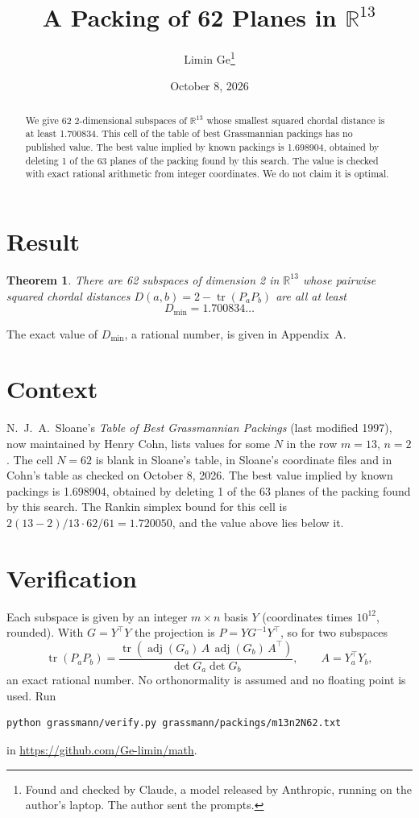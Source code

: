 \documentclass[11pt,a4paper]{article}
\title{A Packing of 62 Planes in $\mathbb{R}^{13}$}
\author{Limin Ge\thanks{Found and checked by Claude, a model released by Anthropic, running on the author's laptop. The author sent the prompts.}}
\date{October 8, 2026}
\newtheorem*{theorem}{Theorem}
\begin{document}
\maketitle
\begin{abstract}
We give 62 2-dimensional subspaces of $\mathbb{R}^{13}$ whose smallest squared chordal distance is at least 1.700834. This cell of the table of best Grassmannian packings has no published value. The best value implied by known packings is 1.698904, obtained by deleting 1 of the 63 planes of the packing found by this search. The value is checked with exact rational arithmetic from integer coordinates. We do not claim it is optimal.
\end{abstract}

\section{Result}
\begin{theorem}
There are 62 subspaces of dimension 2 in $\mathbb{R}^{13}$ whose pairwise squared chordal distances $D(a,b) = 2 - \operatorname{tr}(P_aP_b)$ are all at least
\[ D_{\min} = 1.700834\ldots \]
\end{theorem}
The exact value of $D_{\min}$, a rational number, is given in Appendix~A.


\section{Context}
N.~J.~A.~Sloane's \emph{Table of Best Grassmannian Packings} (last modified 1997), now maintained by Henry Cohn, lists values for some $N$ in the row $m=13$, $n=2$. The cell $N=62$ is blank in Sloane's table, in Sloane's coordinate files and in Cohn's table as checked on October 8, 2026. The best value implied by known packings is 1.698904, obtained by deleting 1 of the 63 planes of the packing found by this search. The Rankin simplex bound for this cell is $2(13-2)/13\cdot 62/61 = 1.720050$, and the value above lies below it.


\section{Verification}
Each subspace is given by an integer $m\times n$ basis $Y$ (coordinates times $10^{12}$, rounded). With $G=Y^\top Y$ the projection is $P=YG^{-1}Y^\top$, so for two subspaces
\[ \operatorname{tr}(P_aP_b)=\frac{\operatorname{tr}(\operatorname{adj}(G_a)\,A\,\operatorname{adj}(G_b)\,A^\top)}{\det G_a\det G_b},\qquad A=Y_a^\top Y_b, \]
an exact rational number. No orthonormality is assumed and no floating point is used. Run
\begin{verbatim}
python grassmann/verify.py grassmann/packings/m13n2N62.txt
\end{verbatim}
in \url{https://github.com/Ge-limin/math}.
\end{document}
